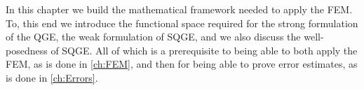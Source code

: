 In this chapter we build the mathematical framework needed to apply the FEM. To,
this end we introduce the functional space required for the strong formulation
of the QGE, the weak formulation of SQGE, and we also discuss the well-posedness
of SQGE. All of which is a prerequisite to being able to both apply the FEM, as
is done in \autoref{ch:FEM}, and then for being able to prove error estimates,
as is done in \autoref{ch:Errors}.
